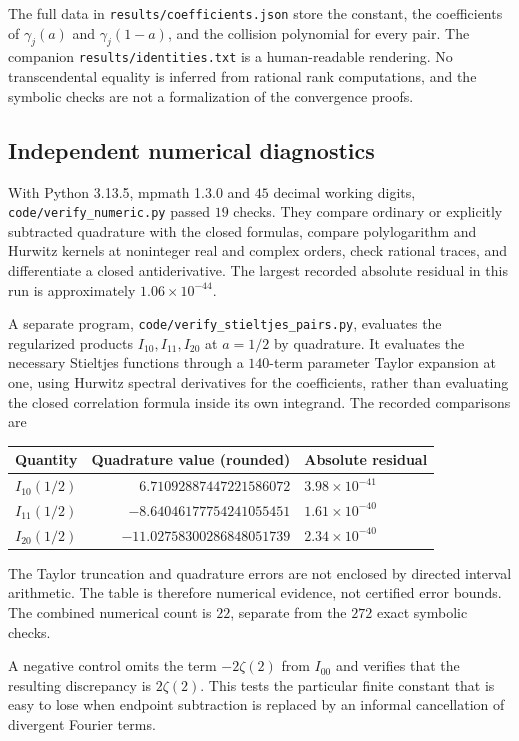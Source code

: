 \documentclass[11pt]{article}
\numberwithin{equation}{section}
\theoremstyle{definition}
\theoremstyle{remark}
\newcommand{\file}[1]{\nolinkurl{#1}}
\begin{document}
The full data in \file{results/coefficients.json} store the constant,
the coefficients of $\gamma_j(a)$ and $\gamma_j(1-a)$, and the collision
polynomial for every pair. The companion \file{results/identities.txt}
is a human-readable rendering. No transcendental equality is inferred
from rational rank computations, and the symbolic checks are not a
formalization of the convergence proofs.

\subsection{Independent numerical diagnostics}
With Python 3.13.5, mpmath 1.3.0 and $45$ decimal working digits,
\file{code/verify_numeric.py} passed $19$ checks. They compare ordinary
or explicitly subtracted quadrature with the closed formulas, compare
polylogarithm and Hurwitz kernels at noninteger real and complex orders,
check rational traces, and differentiate a closed antiderivative.
The largest recorded absolute residual in this run is approximately
$1.06\times10^{-44}$.

A separate program, \file{code/verify_stieltjes_pairs.py}, evaluates the
regularized products $I_{10},I_{11},I_{20}$ at $a=1/2$ by quadrature.
It evaluates the necessary Stieltjes functions through a $140$-term
parameter Taylor expansion at one, using Hurwitz spectral derivatives
for the coefficients, rather than evaluating the closed correlation
formula inside its own integrand. The recorded comparisons are
\begin{center}
\begin{tabular}{@{}lrl@{}}
\toprule
Quantity & Quadrature value (rounded) & Absolute residual\\
\midrule
$I_{10}(1/2)$ & $6.71092887447221586072$ & $3.98\times10^{-41}$\\
$I_{11}(1/2)$ & $-8.64046177754241055451$ & $1.61\times10^{-40}$\\
$I_{20}(1/2)$ & $-11.02758300286848051739$ & $2.34\times10^{-40}$\\
\bottomrule
\end{tabular}
\end{center}
The Taylor truncation and quadrature errors are not enclosed by directed
interval arithmetic. The table is therefore numerical evidence, not
certified error bounds. The combined numerical count is $22$, separate
from the $272$ exact symbolic checks.

A negative control omits the term $-2\zeta(2)$ from $I_{00}$ and verifies
that the resulting discrepancy is $2\zeta(2)$. This tests the particular
finite constant that is easy to lose when endpoint subtraction is
replaced by an informal cancellation of divergent Fourier terms.
\end{document}
